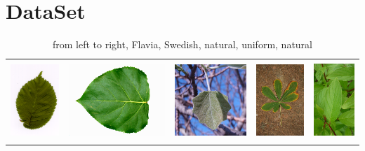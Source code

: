 \documentclass[journal, 10pt]{IEEEtran}
\begin{document}
\section{DataSet}
\label{DataSet}
  \begin{table}
  \begin{tabular}{c@{}c@{}c@{}c@{}c@{}}
  {\includegraphics[height=8.0em]{swedish1}} &
  {\includegraphics[height=8.0em]{flavia1}} &
  {\includegraphics[height=8.0em]{clef1}} &
  {\includegraphics[height=8.0em]{clef2}} &
  {\includegraphics[height=8.0em]{clef3}}
  \end{tabular}
  \caption{from left to right, Flavia, Swedish, natural, uniform, natural}
  \end{table}
\end{document}
